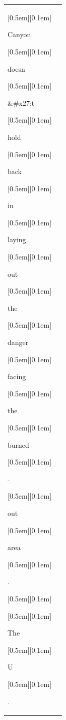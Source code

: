 \begin{table}[ht]
\begin{tabular}{@{}l p{13cm}@{}}
{\setlength{\fboxsep}{1pt}\raisebox{0pt}[0.5em][0.1em]{\colorbox{Salmon!60}{\strut{ Canyon}}}}{\setlength{\fboxsep}{1pt}\raisebox{0pt}[0.5em][0.1em]{\colorbox{DarkOrchid!25}{\strut{ doesn}}}}{\setlength{\fboxsep}{1pt}\raisebox{0pt}[0.5em][0.1em]{\colorbox{Salmon!60}{\strut{\&\#x27;t}}}}{\setlength{\fboxsep}{1pt}\raisebox{0pt}[0.5em][0.1em]{\colorbox{Salmon!60}{\strut{ hold}}}}{\setlength{\fboxsep}{1pt}\raisebox{0pt}[0.5em][0.1em]{\colorbox{Salmon!60}{\strut{ back}}}}{\setlength{\fboxsep}{1pt}\raisebox{0pt}[0.5em][0.1em]{\colorbox{Salmon!60}{\strut{ in}}}}{\setlength{\fboxsep}{1pt}\raisebox{0pt}[0.5em][0.1em]{\colorbox{Salmon!60}{\strut{ laying}}}}{\setlength{\fboxsep}{1pt}\raisebox{0pt}[0.5em][0.1em]{\colorbox{Salmon!60}{\strut{ out}}}}{\setlength{\fboxsep}{1pt}\raisebox{0pt}[0.5em][0.1em]{\colorbox{SkyBlue!55}{\strut{ the}}}}{\setlength{\fboxsep}{1pt}\raisebox{0pt}[0.5em][0.1em]{\colorbox{DarkOrchid!25}{\strut{ danger}}}}{\setlength{\fboxsep}{1pt}\raisebox{0pt}[0.5em][0.1em]{\colorbox{SkyBlue!55}{\strut{ facing}}}}{\setlength{\fboxsep}{1pt}\raisebox{0pt}[0.5em][0.1em]{\colorbox{SkyBlue!55}{\strut{ the}}}}{\setlength{\fboxsep}{1pt}\raisebox{0pt}[0.5em][0.1em]{\colorbox{Salmon!60}{\strut{ burned}}}}{\setlength{\fboxsep}{1pt}\raisebox{0pt}[0.5em][0.1em]{\colorbox{DarkOrchid!25}{\strut{-}}}}{\setlength{\fboxsep}{1pt}\raisebox{0pt}[0.5em][0.1em]{\colorbox{Salmon!60}{\strut{out}}}}{\setlength{\fboxsep}{1pt}\raisebox{0pt}[0.5em][0.1em]{\colorbox{Salmon!60}{\strut{ area}}}}{\setlength{\fboxsep}{1pt}\raisebox{0pt}[0.5em][0.1em]{\colorbox{DarkOrchid!25}{\strut{.}}}}{\setlength{\fboxsep}{1pt}\raisebox{0pt}[0.5em][0.1em]{\colorbox{DarkOrchid!25}{\strut{ }}}}{\setlength{\fboxsep}{1pt}\raisebox{0pt}[0.5em][0.1em]{\colorbox{DarkOrchid!25}{\strut{The}}}}{\setlength{\fboxsep}{1pt}\raisebox{0pt}[0.5em][0.1em]{\colorbox{DarkOrchid!25}{\strut{ U}}}}{\setlength{\fboxsep}{1pt}\raisebox{0pt}[0.5em][0.1em]{\colorbox{DarkOrchid!25}{\strut{.}}}}


\end{tabular}
\end{table}
